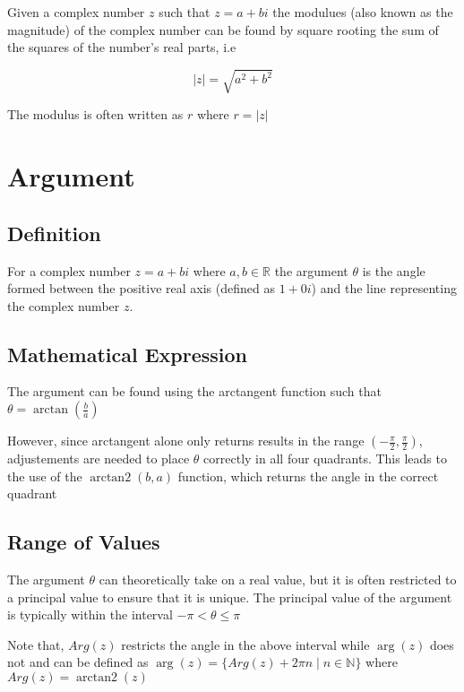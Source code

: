 \documentclass[12pt]{article}
\newcommand{\N}{{\mathbb{N}}}
\newcommand{\R}{{\mathbb{R}}}
\DeclareMathOperator{\arctantwo}{arctan2}
\begin{document}
    Given a complex number $z$ such that $z = a + bi$ the modulues (also known as the magnitude) of
    the complex number can be found by square rooting the sum of the squares
    of the number's real parts, i.e

    \[
        |z| = \sqrt{a^2 + b^2}    
    \]

    The modulus is often written as $r$ where $r = |z|$

    \section{Argument}

    \subsection{Definition}

    For a complex number $z = a + bi$ where $a, b \in\R$ the argument $\theta$ is the angle formed between
    the positive real axis (defined as $1 + 0i$) and the line representing the complex number $z$. 
    
    \subsection{Mathematical Expression}

    The argument can be found using the arctangent function such that $\theta = \arctan\left(\frac{b}{a}\right)$

    However, since arctangent alone only returns results in the range $(-\frac{\pi}{2}, \frac{\pi}{2})$, adjustements 
    are needed to place $\theta$ correctly in all four quadrants. This leads to the use of the $\arctantwo(b, a)$ function,
    which returns the angle in the correct quadrant

    \subsection{Range of Values}

    The argument $\theta$ can theoretically take on a real value, but it is often restricted to a principal value 
    to ensure that it is unique. The principal value of the argument is typically within the interval $-\pi < \theta\le\pi$
    
    Note that, $Arg(z)$ restricts the angle in the above interval while $\arg(z)$ does not and can be defined as 
    $\arg(z) = \{Arg(z) + 2\pi n \mid n \in\N\}$ where $Arg(z) = \arctantwo(z)$
\end{document}
